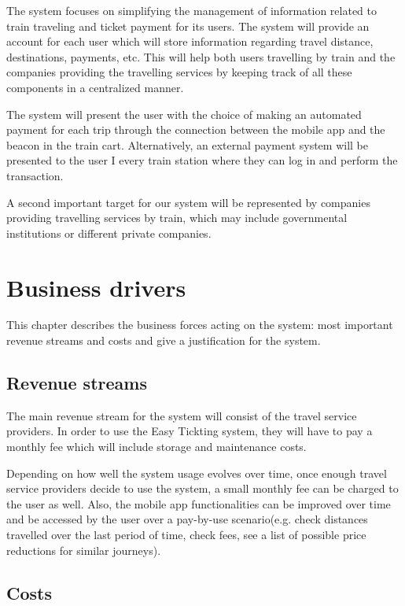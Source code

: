 The system focuses on simplifying the management of information related to train traveling and ticket payment for its users. The system will provide an account for each user which will store information regarding travel distance, destinations, payments, etc. This will help both users travelling by train and the companies providing the travelling services by keeping track of all these components in a centralized manner. 

The system will present the user with the choice of making an automated payment for each trip through the connection between the mobile app and the beacon in the train cart. Alternatively, an external payment system will be presented to the user I every train station where they can log in and perform the transaction. 

A second important target for our system will be represented by companies providing travelling services by train, which may include governmental institutions or different private companies.

\section{Business drivers}
This chapter describes the business forces acting on the system: most important revenue streams and costs and give a justification for the system.

\subsection{Revenue streams}
The main revenue stream for the system will consist of the travel service providers. In order to use the Easy Tickting system, they will have to pay a monthly fee which will include storage and maintenance costs. 

Depending on how well the system usage evolves over time, once enough travel service providers decide to use the system, a small monthly fee can be charged to the user as well. Also, the mobile app functionalities can be improved over time and be accessed by the user over a pay-by-use scenario(e.g. check distances travelled over the last period of time, check fees, see a list of possible price reductions for similar journeys).

\subsection{Costs} 


